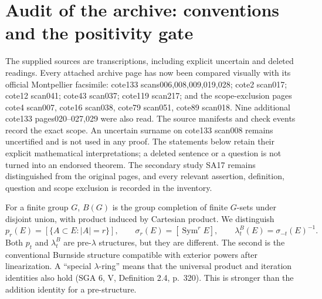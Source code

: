 \documentclass[11pt]{article}
\begin{document}
\section{Audit of the archive: conventions and the positivity gate}
The supplied sources are transcriptions, including explicit uncertain and
deleted readings. Every attached archive page has now been compared visually
with its official Montpellier facsimile: cote133 scans006,008,009,019,028;
cote2 scan017; cote12 scan041; cote43 scan037; cote119 scan217; and the
scope-exclusion pages cote4 scan007, cote16 scan038, cote79 scan051,
cote89 scan018. Nine additional cote133 pages020--027,029 were also read.
The source manifests and check events record the exact scope. An uncertain
surname on cote133 scan008 remains uncertified and is not used in any proof.
The statements below retain their explicit mathematical interpretations;
a deleted sentence or a question is not turned into an endorsed theorem.
The secondary study SA17 remains distinguished from the original pages,
and every relevant assertion, definition, question and scope exclusion is
recorded in the inventory.

For a finite group $G$, $B(G)$ is the group completion of finite $G$-sets under
disjoint union, with product induced by Cartesian product.  We distinguish
\[
 p_r(E)=[\{A\subset E:|A|=r\}],\qquad
 \sigma_r(E)=[\operatorname{Sym}^rE],\qquad
 \lambda_t^B(E)=\sigma_{-t}(E)^{-1}.
\]
Both $p_t$ and $\lambda_t^B$ are pre-$\lambda$ structures, but they are different.
The second is the conventional Burnside structure compatible with exterior
powers after linearization.  A ``special $\lambda$-ring'' means that the
universal product and iteration identities also hold (SGA 6, V, Definition
2.4, p.~320).  This is stronger than the addition identity for a pre-structure.
\end{document}
